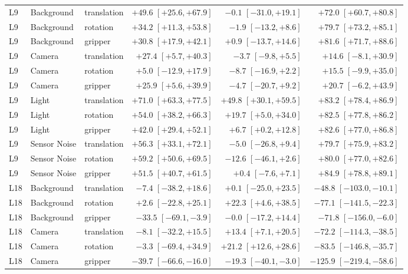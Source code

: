 \begin{table}[t]
\begin{tabular}{@{}lllrrr@{}}
\midrule
L9 & Background & translation & $+49.6$ $[+25.6,+67.9]$ & $-0.1$ $[-31.0,+19.1]$ & $+72.0$ $[+60.7,+80.8]$\\
L9 & Background & rotation & $+34.2$ $[+11.3,+53.8]$ & $-1.9$ $[-13.2,+8.6]$ & $+79.7$ $[+73.2,+85.1]$\\
L9 & Background & gripper & $+30.8$ $[+17.9,+42.1]$ & $+0.9$ $[-13.7,+14.6]$ & $+81.6$ $[+71.7,+88.6]$\\
L9 & Camera & translation & $+27.4$ $[+5.7,+40.3]$ & $-3.7$ $[-9.8,+5.5]$ & $+14.6$ $[-8.1,+30.9]$\\
L9 & Camera & rotation & $+5.0$ $[-12.9,+17.9]$ & $-8.7$ $[-16.9,+2.2]$ & $+15.5$ $[-9.9,+35.0]$\\
L9 & Camera & gripper & $+25.9$ $[+5.6,+39.9]$ & $-4.7$ $[-20.7,+9.2]$ & $+20.7$ $[-6.2,+43.9]$\\
L9 & Light & translation & $+71.0$ $[+63.3,+77.5]$ & $+49.8$ $[+30.1,+59.5]$ & $+83.2$ $[+78.4,+86.9]$\\
L9 & Light & rotation & $+54.0$ $[+38.2,+66.3]$ & $+19.7$ $[+5.0,+34.0]$ & $+82.5$ $[+77.8,+86.2]$\\
L9 & Light & gripper & $+42.0$ $[+29.4,+52.1]$ & $+6.7$ $[+0.2,+12.8]$ & $+82.6$ $[+77.0,+86.8]$\\
L9 & Sensor Noise & translation & $+56.3$ $[+33.1,+72.1]$ & $-5.0$ $[-26.8,+9.4]$ & $+79.7$ $[+75.9,+83.2]$\\
L9 & Sensor Noise & rotation & $+59.2$ $[+50.6,+69.5]$ & $-12.6$ $[-46.1,+2.6]$ & $+80.0$ $[+77.0,+82.6]$\\
L9 & Sensor Noise & gripper & $+51.5$ $[+40.7,+61.5]$ & $+0.4$ $[-7.6,+7.1]$ & $+84.9$ $[+78.8,+89.1]$\\
\midrule
L18 & Background & translation & $-7.4$ $[-38.2,+18.6]$ & $+0.1$ $[-25.0,+23.5]$ & $-48.8$ $[-103.0,-10.1]$\\
L18 & Background & rotation & $+2.6$ $[-22.8,+25.1]$ & $+22.3$ $[+4.6,+38.5]$ & $-77.1$ $[-141.5,-22.3]$\\
L18 & Background & gripper & $-33.5$ $[-69.1,-3.9]$ & $-0.0$ $[-17.2,+14.4]$ & $-71.8$ $[-156.0,-6.0]$\\
L18 & Camera & translation & $-8.1$ $[-32.2,+15.5]$ & $+13.4$ $[+7.1,+20.5]$ & $-72.2$ $[-114.3,-38.5]$\\
L18 & Camera & rotation & $-3.3$ $[-69.4,+34.9]$ & $+21.2$ $[+12.6,+28.6]$ & $-83.5$ $[-146.8,-35.7]$\\
L18 & Camera & gripper & $-39.7$ $[-66.6,-16.0]$ & $-19.3$ $[-40.1,-3.0]$ & $-125.9$ $[-219.4,-58.6]$\\

\end{tabular}
\end{table}

